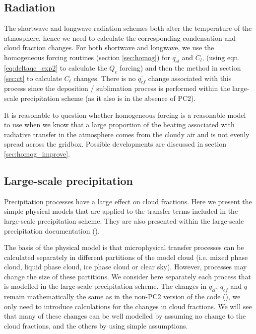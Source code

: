 \documentclass{UMDP_article}
\begin{document}
\subsection{Radiation}
\label{sec:rad}

The shortwave and longwave radiation schemes both alter the temperature
of the atmosphere, hence we need to calculate the corresponding condensation
and cloud fraction changes. For both shortwave and longwave, we use
the homogeneous forcing routines (section \ref{sec:homog})
for $\overline{q_{cl}}$ and $C_l$, (using eqn.
\ref{eq:deltaqc_exp2} to calculate the $Q_c$ forcing) and then the method in
section \ref{sec:ct} to calculate $C_t$ changes. There is no
$\overline{q_{cf}}$ change associated with this process since the
deposition / sublimation process is performed within the large-scale
precipitation scheme (as it also is in the absence of PC2).

It is reasonable to question whether homogeneous forcing is a reasonable
model to use when we know that a large proportion of the heating
associated with radiative transfer in the atmosphere comes from the
cloudy air and is not evenly spread across the gridbox. Possible developments
are discussed in section \ref{sec:homog_improve}.

\subsection{Large-scale precipitation}
\label{sec:precip}

Precipitation processes have a large effect on cloud fractions. Here we
present the simple physical models that are applied to the transfer
terms included in the large-scale precipitation scheme. They are also
presented within the large-scale precipitation documentation ().

The basis of the physical model is that microphysical transfer processes can
be calculated separately in different partitions of the model cloud
(i.e. mixed phase cloud, liquid phase cloud, ice phase cloud or clear sky).
However, processes may change the size of these partitions. We consider
here separately each process that is modelled in the large-scale
precipitation scheme. The changes in $\overline{q_{cl}}$, $\overline{q_{cf}}$
and $\overline{q}$ remain mathematically the same as in the non-PC2 version
of the code (), we only need
to introduce calculations for the changes in cloud fractions. We will see
that many of these
changes can be well modelled by assuming no change to the cloud fractions,
and the others by using simple assumptions.
\end{document}
